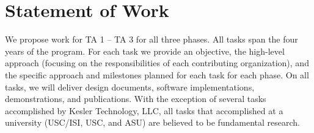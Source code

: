 
\section{Statement of Work}
We propose work for TA 1 – TA 3 for all three phases. All tasks span the four years of the program. For each task we provide an objective, the high-level approach (focusing on the responsibilities of each contributing organization), and the specific approach and milestones planned for each task for each phase. On all tasks, we will deliver design documents, software implementations, demonstrations, and publications. With the exception of several tasks accomplished by Kesler Technology, LLC, all tasks that accomplished at a university (USC/ISI, USC, and ASU) are believed to be fundamental research.   

